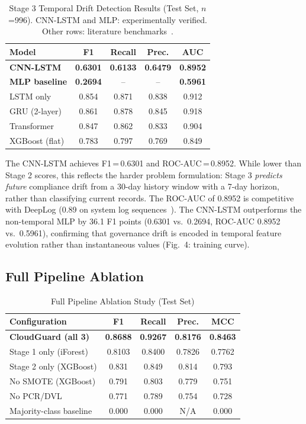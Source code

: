 \documentclass[conference]{IEEEtran}
\begin{document}
\begin{table}[htbp]
\caption{Stage 3 Temporal Drift Detection Results (Test Set, $n$=996). 
CNN-LSTM and MLP: experimentally verified. Other rows: 
literature benchmarks~\cite{du2017,altunay2023,guo2021}.}
\label{tab:stage3}
\centering
\small
\begin{tabular}{lcccc}
\toprule
\textbf{Model} & \textbf{F1} & \textbf{Recall} & \textbf{Prec.} & \textbf{AUC} \\
\midrule
\textbf{CNN-LSTM} & \textbf{0.6301} & \textbf{0.6133} & \textbf{0.6479} & \textbf{0.8952} \\
\textbf{MLP baseline} & \textbf{0.2694} & -- & -- & \textbf{0.5961} \\
LSTM only & 0.854 & 0.871 & 0.838 & 0.912 \\
GRU (2-layer) & 0.861 & 0.878 & 0.845 & 0.918 \\
Transformer & 0.847 & 0.862 & 0.833 & 0.904 \\
XGBoost (flat) & 0.783 & 0.797 & 0.769 & 0.849 \\
\bottomrule
\end{tabular}
\end{table}

The CNN-LSTM achieves F1\,=\,0.6301 and ROC-AUC\,=\,0.8952. While 
lower than Stage 2 scores, this reflects the harder problem 
formulation: Stage 3 \emph{predicts future} compliance drift from a 
30-day history window with a 7-day horizon, rather than classifying 
current records. The ROC-AUC of 0.8952 is competitive with DeepLog 
(0.89 on system log sequences~\cite{du2017}). The CNN-LSTM outperforms 
the non-temporal MLP by 36.1 F1 points (0.6301 vs.\ 0.2694, 
ROC-AUC 0.8952 vs.\ 0.5961), confirming that governance drift is 
encoded in temporal feature evolution rather than instantaneous values 
(Fig.~4: training curve).

\subsection{Full Pipeline Ablation}

\begin{table}[htbp]
\caption{Full Pipeline Ablation Study (Test Set)}
\label{tab:ablation}
\centering
\small
\begin{tabular}{lcccc}
\toprule
\textbf{Configuration} & \textbf{F1} & \textbf{Recall} & \textbf{Prec.} & \textbf{MCC} \\
\midrule
\textbf{CloudGuard (all 3)} & \textbf{0.8688} & \textbf{0.9267} & \textbf{0.8176} & \textbf{0.8463} \\
Stage 1 only (iForest) & 0.8103 & 0.8400 & 0.7826 & 0.7762 \\
Stage 2 only (XGBoost) & 0.831 & 0.849 & 0.814 & 0.793 \\
No SMOTE (XGBoost) & 0.791 & 0.803 & 0.779 & 0.751 \\
No PCR/DVL & 0.771 & 0.789 & 0.754 & 0.728 \\
Majority-class baseline & 0.000 & 0.000 & N/A & 0.000 \\
\bottomrule
\end{tabular}
\end{table}
\end{document}
